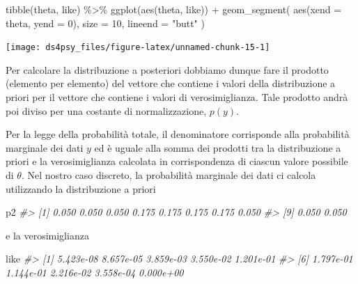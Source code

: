 \documentclass[
  11pt,
]{krantz}
\makeatletter
\newenvironment{Shaded}{\begin{snugshade}}{\end{snugshade}}
\newcommand{\AttributeTok}[1]{\textcolor[rgb]{0.61,0.61,0.61}{#1}}
\newcommand{\CommentTok}[1]{\textcolor[rgb]{0.37,0.37,0.37}{\textit{#1}}}
\newcommand{\DecValTok}[1]{\textcolor[rgb]{0.06,0.06,0.06}{#1}}
\newcommand{\FunctionTok}[1]{\textcolor[rgb]{0,0,0}{#1}}
\newcommand{\NormalTok}[1]{#1}
\newcommand{\SpecialCharTok}[1]{\textcolor[rgb]{0,0,0}{#1}}
\newcommand{\StringTok}[1]{\textcolor[rgb]{0.5,0.5,0.5}{#1}}
\newenvironment{kframe}{%
\medskip{}
\setlength{\fboxsep}{.8em}
 \def\at@end@of@kframe{}%
 \ifinner\ifhmode%
  \def\at@end@of@kframe{\end{minipage}}%
  \begin{minipage}{\columnwidth}%
 \fi\fi%
 \def\FrameCommand##1{\hskip\@totalleftmargin \hskip-\fboxsep
 \colorbox{shadecolor}{##1}\hskip-\fboxsep
     \hskip-\linewidth \hskip-\@totalleftmargin \hskip\columnwidth}%
 \MakeFramed {\advance\hsize-\width
   \@totalleftmargin\z@ \linewidth\hsize
   \@setminipage}}%
 {\par\unskip\endMakeFramed%
 \at@end@of@kframe}
\renewenvironment{Shaded}{\begin{kframe}}{\end{kframe}}
\theoremstyle{definition}
\theoremstyle{definition}
\theoremstyle{definition}
\theoremstyle{definition}
\theoremstyle{remark}
\makeatother
\begin{document}
\begin{Shaded}
\begin{Highlighting}[]
\FunctionTok{tibble}\NormalTok{(theta, like) }\SpecialCharTok{\%\textgreater{}\%}
  \FunctionTok{ggplot}\NormalTok{(}\FunctionTok{aes}\NormalTok{(theta, like)) }\SpecialCharTok{+}
  \FunctionTok{geom\_segment}\NormalTok{(}
    \FunctionTok{aes}\NormalTok{(}\AttributeTok{xend =}\NormalTok{ theta, }\AttributeTok{yend =} \DecValTok{0}\NormalTok{),}
    \AttributeTok{size =} \DecValTok{10}\NormalTok{, }\AttributeTok{lineend =} \StringTok{"butt"}
\NormalTok{  )}
\end{Highlighting}
\end{Shaded}

\begin{center}\texttt{[image: ds4psy\_files/figure-latex/unnamed-chunk-15-1]} \end{center}

Per calcolare la distribuzione a posteriori dobbiamo dunque fare il prodotto (elemento per elemento) del vettore che contiene i valori della distribuzione a priori per il vettore che contiene i valori di verosimiglianza. Tale prodotto andrà poi diviso per una costante di normalizzazione, \(p(y)\).

Per la legge della probabilità totale, il denominatore corrisponde alla probabilità marginale dei dati \(y\) ed è uguale alla somma dei prodotti tra la distribuzione a priori e la verosimiglianza calcolata in corrispondenza di ciascun valore possibile di \(\theta\). Nel nostro caso discreto, la probabilità marginale dei dati ci calcola utilizzando la distribuzione a priori

\begin{Shaded}
\begin{Highlighting}[]
\NormalTok{p2}
\CommentTok{\#\textgreater{}  [1] 0.050 0.050 0.050 0.175 0.175 0.175 0.175 0.050}
\CommentTok{\#\textgreater{}  [9] 0.050 0.050}
\end{Highlighting}
\end{Shaded}

e la verosimiglianza

\begin{Shaded}
\begin{Highlighting}[]
\NormalTok{like}
\CommentTok{\#\textgreater{}  [1] 5.423e{-}08 8.657e{-}05 3.859e{-}03 3.550e{-}02 1.201e{-}01}
\CommentTok{\#\textgreater{}  [6] 1.797e{-}01 1.144e{-}01 2.216e{-}02 3.558e{-}04 0.000e+00}
\end{Highlighting}
\end{Shaded}
\end{document}
